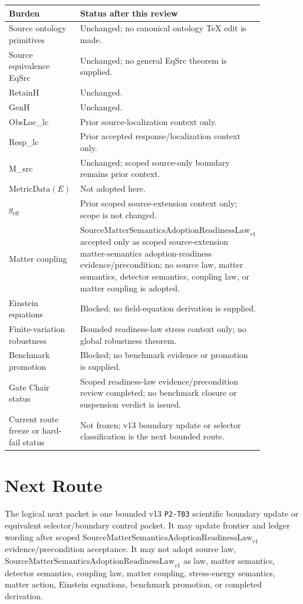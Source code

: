 \documentclass[11pt]{article}
\newcommand{\SMSAR}{\mathrm{SourceMatterSemanticsAdoptionReadinessLaw}_{v1}}
\newcommand{\MetricData}{\mathrm{MetricData}}
\newcommand{\geff}{g_{\mathrm{eff}}}
\begin{document}
\begin{longtable}{p{0.30\linewidth}p{0.56\linewidth}}
\toprule
Burden & Status after this review \\
\midrule
Source ontology primitives & Unchanged; no canonical ontology TeX edit is made. \\
Source equivalence EqSrc & Unchanged; no general EqSrc theorem is supplied. \\
RetainH & Unchanged. \\
GenH & Unchanged. \\
ObsLoc\_lc & Prior source-localization context only. \\
Resp\_lc & Prior accepted response/localization context only. \\
M\_src & Unchanged; scoped source-only boundary remains prior context. \\
\(\MetricData(E)\) & Not adopted here. \\
\(\geff\) & Prior scoped source-extension context only; scope is not changed. \\
Matter coupling & \(\SMSAR\) accepted only as scoped source-extension matter-semantics adoption-readiness evidence/precondition; no source law, matter semantics, detector semantics, coupling law, or matter coupling is adopted. \\
Einstein equations & Blocked; no field-equation derivation is supplied. \\
Finite-variation robustness & Bounded readiness-law stress context only; no global robustness theorem. \\
Benchmark promotion & Blocked; no benchmark evidence or promotion is supplied. \\
Gate Chair status & Scoped readiness-law evidence/precondition review completed; no benchmark closure or suspension verdict is issued. \\
Current route freeze or hard-fail status & Not frozen; v13 boundary update or selector classification is the next bounded route. \\
\bottomrule
\end{longtable}

\section{Next Route}

The logical next packet is one bounded v13 \texttt{P2-T03} scientific
boundary update or equivalent selector/boundary control packet. It may update
frontier and ledger wording after scoped \(\SMSAR\) evidence/precondition
acceptance. It may not adopt source law, \(\SMSAR\) as law, matter semantics,
detector semantics, coupling law, matter coupling, stress-energy semantics,
matter action, Einstein equations, benchmark promotion, or completed
derivation.
\end{document}
